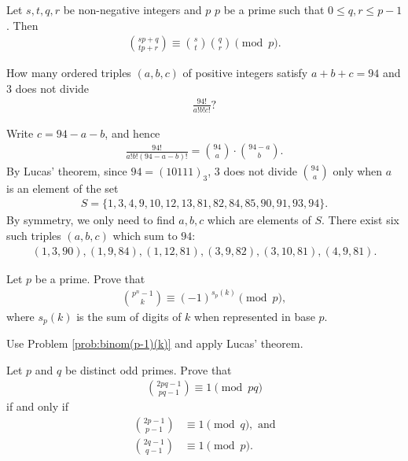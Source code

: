 \documentclass[12pt]{subfile}
\begin{document}
	\begin{corollary}\label{cor:lucas}
		Let $s,t,q,r$ be non-negative integers and $p$ $p$ be a prime such that $0 \leq q,r \leq p-1$. Then
		\begin{align*}
		\binom{sp+q}{tp+r} \equiv \binom{s}{t} \binom{q}{r} \pmod p.
		\end{align*}
	\end{corollary}
	
	\begin{problem}
		How many ordered triples $(a,b,c)$ of positive integers satisfy $a+b+c=94$ and $3$ does not divide
			\begin{align*}
				\frac{94!}{a!b!c!}?
			\end{align*}
	\end{problem}
	
	\begin{solution}
		Write $c=94-a-b$, and hence
			\begin{align*}
				\frac{94!}{a!b!(94 - a - b)!} = \binom{94}{a} \cdot \binom{94 - a}{b}.
			\end{align*}
		By Lucas' theorem, since $94=(10111)_3$, $3$ does not divide $\binom{94}{a}$ only when $a$ is an element of the set
			\begin{align*}
				 S= \{1, 3, 4, 9, 10, 12, 13, 81, 82, 84, 85, 90, 91, 93, 94\}.
			\end{align*}
		By symmetry, we only need to find $a,b,c$ which are elements of $S$. There exist six such triples $(a,b,c)$ which sum to $94$:
			\begin{align*}
				(1,3,90), (1, 9, 84), (1, 12, 81), (3, 9, 82), (3, 10, 81), (4,9,81).
			\end{align*}
	\end{solution}
	
	\begin{problem}
		Let $p$ be a prime. Prove that
			\begin{align*}
				\binom{p^n-1}{k}\equiv (-1)^{s_p(k)}\pmod p,
			\end{align*}
		where $s_p(k)$ is the sum of digits of $k$ when represented in base $p$.
	\end{problem}
	
	\begin{hint}
		Use Problem \ref{prob:binom(p-1)(k)} and apply Lucas' theorem.
	\end{hint}
	
	\begin{problem}
		Let $p$ and $q$ be distinct odd primes. Prove that
			\begin{align*}
				\binom{2pq-1}{pq-1}\equiv 1\pmod{pq}
			\end{align*}
		if and only if
			\begin{align*}
				\binom{2p-1}{p-1} &\equiv 1 \pmod q, \text{ and}\\
				\binom{2q-1}{q-1} &\equiv 1 \pmod p.
			\end{align*}
	\end{problem}
	
\end{document}
